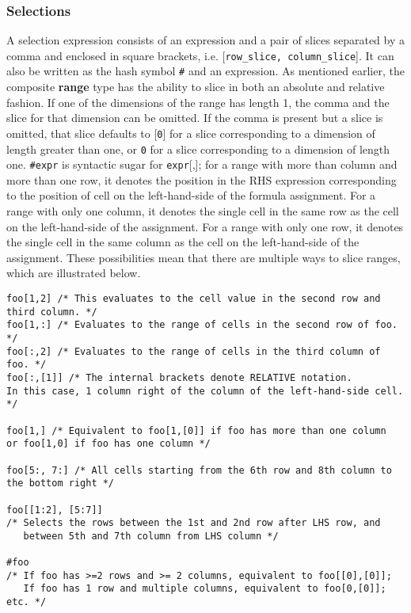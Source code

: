 \subsubsection{Selections}
A selection expression consists of an expression and a pair of slices separated by a comma and enclosed in square brackets, i.e. {[}\texttt{row\_slice, column\_slice}{]}. It can also be written as the hash symbol \texttt{\#} and an expression. As mentioned earlier, the composite \textbf{range} type has the ability to slice in both an absolute and relative fashion. If one of the dimensions of the range has length 1, the comma and the slice for that dimension can be omitted. If the comma is present but a slice is omitted, that slice defaults to {[}\texttt{0}{]} for a slice corresponding to a dimension of length greater than one, or \texttt{0} for a slice corresponding to a dimension of length one. \texttt{\#expr} is syntactic sugar for \texttt{expr}{[},{]}; for a range with more than column and more than one row, it denotes the position in the RHS expression corresponding to the position of cell on the left-hand-side of the formula assignment. For a range with only one column, it denotes the single cell in the same row as the cell on the left-hand-side of the assignment. For a range with only one row, it denotes the single cell in the same column as the cell on the left-hand-side of the assignment. These possibilities mean that there are multiple ways to slice ranges, which are illustrated below.\newline
\begin{lstlisting}
foo[1,2] /* This evaluates to the cell value in the second row and third column. */
foo[1,:] /* Evaluates to the range of cells in the second row of foo. */
foo[:,2] /* Evaluates to the range of cells in the third column of foo. */
foo[:,[1]] /* The internal brackets denote RELATIVE notation. 
In this case, 1 column right of the column of the left-hand-side cell. */ 

foo[1,] /* Equivalent to foo[1,[0]] if foo has more than one column
or foo[1,0] if foo has one column */

foo[5:, 7:] /* All cells starting from the 6th row and 8th column to the bottom right */

foo[[1:2], [5:7]] 
/* Selects the rows between the 1st and 2nd row after LHS row, and 
   between 5th and 7th column from LHS column */

#foo 
/* If foo has >=2 rows and >= 2 columns, equivalent to foo[[0],[0]]; 
   If foo has 1 row and multiple columns, equivalent to foo[0,[0]]; etc. */
\end{lstlisting}
